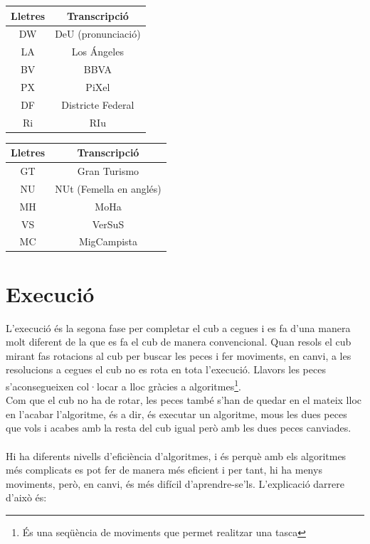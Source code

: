 \begin{table}[h]
    \begin{minipage}{.5\linewidth}
        \centering
        \begin{tabular}{|c|c|}
            \hline
            Lletres & Transcripció\\
            \hline
            DW & DeU (pronunciació)\\
            \hline
            LA & Los Ángeles\\
            \hline
            BV & BBVA\\
            \hline
            PX & PiXel\\
            \hline
            DF &  Districte Federal\\
            \hline 
            Ri & RIu  \\
            \hline
        \end{tabular}
    \end{minipage}
    \begin{minipage}{.5\linewidth}
        \centering
        \begin{tabular}{|c|c|}
            \hline
            Lletres & Transcripció\\
            \hline
            GT & Gran Turismo \\
            \hline
            NU & NUt (Femella en anglés)\\
            \hline
            MH & MoHa\\
            \hline
            VS &  VerSuS\\
            \hline 
            MC &  MigCampista\\
            \hline
        \end{tabular}
    \end{minipage} 
\end{table}





\section{Execució}

L'execució és la segona fase per completar el cub a cegues i es fa d'una manera molt diferent de la que es fa el cub de manera convencional. Quan resols el cub mirant fas rotacions al cub per buscar les peces i fer moviments, en canvi, a les resolucions a cegues el cub no es rota en tota l'execució. Llavors les peces s'aconsegueixen col·locar a lloc gràcies a algoritmes\footnote{És una seqüència de moviments que permet realitzar una tasca}.
\\Com que el cub no ha de rotar, les peces també s'han de quedar en el mateix lloc en l'acabar l'algoritme, és a dir, és executar un algoritme, mous les dues peces que vols i acabes amb la resta del cub igual però amb les dues peces canviades. \cite{3BLD}
\\\\Hi ha diferents nivells d'eficiència d'algoritmes, i és perquè amb els algoritmes més complicats es pot fer de manera més eficient i per tant, hi ha menys moviments, però, en canvi, és més difícil d'aprendre-se'ls. L'explicació darrere d'això és:

